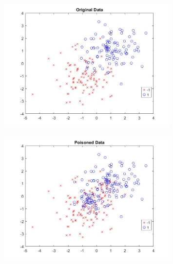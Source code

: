 \begin{figure}[H]
	\centering
	\includegraphics[width=0.8\textwidth]{media/ict2/image226}
	\caption*{}
\end{figure}

\begin{figure}[H]
	\centering
	\includegraphics[width=0.8\textwidth]{media/ict2/image227}
	\caption*{}
\end{figure}

